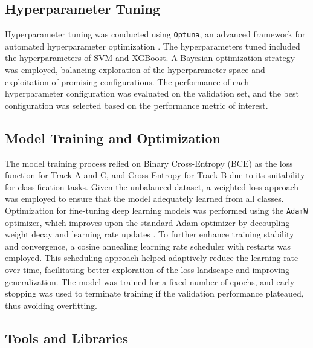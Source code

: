 \subsection{Hyperparameter Tuning}

Hyperparameter tuning was conducted using \texttt{Optuna}, an advanced framework for automated hyperparameter optimization \citep{Akiba2019Optuna}. The hyperparameters tuned included the hyperparameters of SVM and XGBoost. A Bayesian optimization strategy was employed, balancing exploration of the hyperparameter space and exploitation of promising configurations. The performance of each hyperparameter configuration was evaluated on the validation set, and the best configuration was selected based on the performance metric of interest.

\subsection{Model Training and Optimization}

The model training process relied on Binary Cross-Entropy (BCE) as the loss function for Track A and C, and Cross-Entropy for Track B due to its suitability for classification tasks. Given the unbalanced dataset, a weighted loss approach was employed to ensure that the model adequately learned from all classes. Optimization for fine-tuning deep learning models was performed using the \texttt{AdamW} optimizer, which improves upon the standard Adam optimizer by decoupling weight decay and learning rate updates \citep{Loshchilov2019AdamW}. To further enhance training stability and convergence, a cosine annealing learning rate scheduler with restarts\cite{loshchilov2017sgdrstochasticgradientdescent} was employed. This scheduling approach helped adaptively reduce the learning rate over time, facilitating better exploration of the loss landscape and improving generalization. The model was trained for a fixed number of epochs, and early stopping was used to terminate training if the validation performance plateaued, thus avoiding overfitting.

\subsection{Tools and Libraries}

